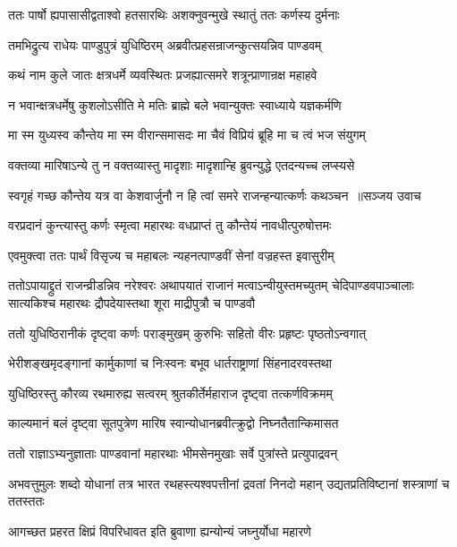 \twolineshloka
{ततः पार्षो ह्यपासासीद्वताश्वो हतसारथिः}
{अशक्नुवन्मुखे स्थातुं ततः कर्णस्य दुर्मनाः}


\twolineshloka
{तमभिद्रुत्य राधेयः पाण्डुपुत्रं युधिष्ठिरम्}
{अब्रवीत्प्रहसन्राजन्कुत्सयन्निव पाण्डवम्}


\twolineshloka
{कथं नाम कुले जातः क्षत्रधर्मे व्यवस्थितः}
{प्रजह्यात्समरे शत्रून्प्राणान्रक्ष महाहवे}


\twolineshloka
{न भवान्क्षत्रधर्मेषु कुशलोऽसीति मे मतिः}
{ब्राह्मे बले भवान्युक्तः स्वाध्याये यज्ञकर्मणि}


\twolineshloka
{मा स्म युध्यस्व कौन्तेय मा स्म वीरान्समासदः}
{मा चैवं विप्रियं ब्रूहि मा च त्वं भज संयुगम्}


\twolineshloka
{वक्तव्या मारिषाऽन्ये तु न वक्तव्यास्तु मादृशाः}
{मादृशान्हि ब्रुवन्युद्धे एतदन्यच्च लप्स्यसे}


\threelineshloka
{स्वगृहं गच्छ कौन्तेय यत्र वा केशवार्जुनौ}
{न हि त्वां समरे राजन्हन्यात्कर्णः कथञ्चन ॥सञ्जय उवाच}
{}


\twolineshloka
{वरप्रदानं कुन्त्यास्तु कर्णः स्मृत्वा महारथः}
{वधप्राप्तं तु कौन्तेयं नावधीत्पुरुषोत्तमः}


\twolineshloka
{एवमुक्त्वा ततः पार्थं विसृज्य च महाबलः}
{न्यहनत्पाण्डवीं सेनां वज्रहस्त इवासुरीम्}


ततोऽपायाद्द्रुतं राजन्व्रीडन्निव नरेश्वरः
\threelineshloka
{अथापयातं राजानं मत्वाऽन्वीयुस्तमच्युतम्}
{चेदिपाण्डवपाञ्चालाः सात्यकिश्च महारथः}
{द्रौपदेयास्तथा शूरा माद्रीपुत्रौ च पाण्डवौ}


\twolineshloka
{ततो युधिष्ठिरानीकं दृष्ट्वा कर्णः पराङ्मुखम्}
{कुरुभिः सहितो वीरः प्रहृष्टः पृष्ठतोऽन्वगात्}


\twolineshloka
{भेरीशङ्खमृदङ्गानां कार्मुकाणां च निःस्वनः}
{बभूव धार्तराष्ट्राणां सिंहनादरवस्तथा}


\twolineshloka
{युधिष्ठिरस्तु कौरव्य रथमारुह्य सत्वरम्}
{श्रुतकीर्तेर्महाराज दृष्ट्वा तत्कर्णविक्रमम्}


\twolineshloka
{काल्यमानं बलं दृष्ट्वा सूतपुत्रेण मारिष}
{स्वान्योधानब्रवीत्क्रुद्वो निघ्नतैतान्किमासत}


\twolineshloka
{ततो राज्ञाऽभ्यनुज्ञाताः पाण्डवानां महारथाः}
{भीमसेनमुखाः सर्वे पुत्रांस्ते प्रत्युपाद्रवन्}


\threelineshloka
{अभवत्तुमुलः शब्दो योधानां तत्र भारत}
{रथहस्त्यश्वपत्तीनां द्रवतां निनदो महान्}
{उद्यतप्रतिविष्टानां शस्त्राणां च ततस्ततः}


\twolineshloka
{आगच्छत प्रहरत क्षिप्रं विपरिधावत}
{इति ब्रुवाणा ह्यन्योन्यं जघ्नुर्योधा महारणे}


